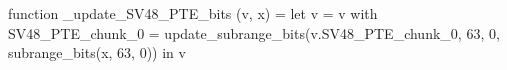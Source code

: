 function _update_SV48_PTE_bits (v, x) = let v = { v with SV48_PTE_chunk_0 = update_subrange_bits(v.SV48_PTE_chunk_0, 63, 0, subrange_bits(x, 63, 0)) } in
  v
